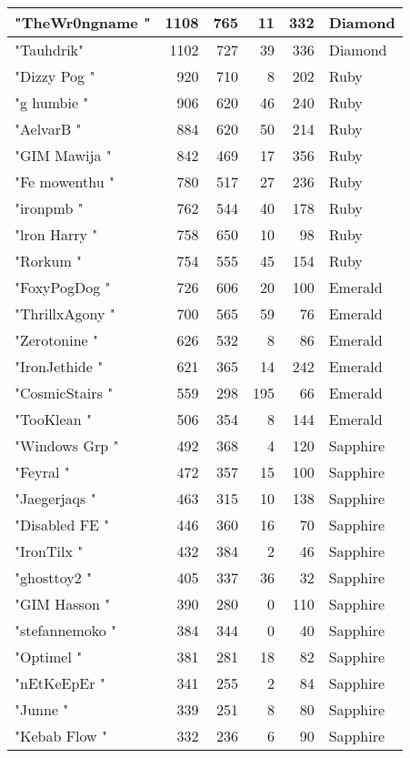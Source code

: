 \documentclass{article}
\begin{document}
\begin{table}[htbp]
\begin{tabular}{|l|r|r|r|r|l|}
"TheWr0ngname " & 1108 & 765 & 11 & 332 & Diamond \\ \hline
"Tauhdrik" & 1102 & 727 & 39 & 336 & Diamond \\ \hline
"Dizzy Pog " & 920 & 710 & 8 & 202 & Ruby \\ \hline
"g humbie " & 906 & 620 & 46 & 240 & Ruby \\ \hline
"AelvarB " & 884 & 620 & 50 & 214 & Ruby \\ \hline
"GIM Mawija " & 842 & 469 & 17 & 356 & Ruby \\ \hline
"Fe mowenthu " & 780 & 517 & 27 & 236 & Ruby \\ \hline
"ironpmb " & 762 & 544 & 40 & 178 & Ruby \\ \hline
"lron Harry " & 758 & 650 & 10 & 98 & Ruby \\ \hline
"Rorkum " & 754 & 555 & 45 & 154 & Ruby \\ \hline
"FoxyPogDog " & 726 & 606 & 20 & 100 & Emerald \\ \hline
"ThrillxAgony " & 700 & 565 & 59 & 76 & Emerald \\ \hline
"Zerotonine " & 626 & 532 & 8 & 86 & Emerald \\ \hline
"IronJethide " & 621 & 365 & 14 & 242 & Emerald \\ \hline
"CosmicStairs " & 559 & 298 & 195 & 66 & Emerald \\ \hline
"TooKlean " & 506 & 354 & 8 & 144 & Emerald \\ \hline
"Windows Grp " & 492 & 368 & 4 & 120 & Sapphire \\ \hline
"Feyral " & 472 & 357 & 15 & 100 & Sapphire \\ \hline
"Jaegerjaqs " & 463 & 315 & 10 & 138 & Sapphire \\ \hline
"Disabled FE " & 446 & 360 & 16 & 70 & Sapphire \\ \hline
"IronTilx " & 432 & 384 & 2 & 46 & Sapphire \\ \hline
"ghosttoy2 " & 405 & 337 & 36 & 32 & Sapphire \\ \hline
"GIM Hasson " & 390 & 280 & 0 & 110 & Sapphire \\ \hline
"stefannemoko " & 384 & 344 & 0 & 40 & Sapphire \\ \hline
"Optimel " & 381 & 281 & 18 & 82 & Sapphire \\ \hline
"nEtKeEpEr " & 341 & 255 & 2 & 84 & Sapphire \\ \hline
"Junne " & 339 & 251 & 8 & 80 & Sapphire \\ \hline
"Kebab Flow " & 332 & 236 & 6 & 90 & Sapphire \\ \hline

\end{tabular}
\end{table}
\end{document}

